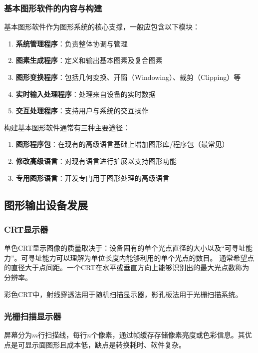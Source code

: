\documentclass[12pt]{article}
\begin{document}
\subsubsection*{基本图形软件的内容与构建}

基本图形软件作为图形系统的核心支撑，一般应包含以下模块：
\begin{enumerate}[label=\arabic*.]
    \item \textbf{系统管理程序}：负责整体协调与管理
    \item \textbf{图素生成程序}：定义和输出基本图素及复合图素
    \item \textbf{图形变换程序}：包括几何变换、开窗（Windowing）、裁剪（Clipping）等
    \item \textbf{实时输入处理程序}：处理来自设备的实时数据
    \item \textbf{交互处理程序}：支持用户与系统的交互操作
\end{enumerate}

构建基本图形软件通常有三种主要途径：
\begin{enumerate}[label=\arabic*.]
    \item \textbf{图形程序包}：在现有的高级语言基础上增加图形库/程序包（最常见）
    \item \textbf{修改高级语言}：对现有语言进行扩展以支持图形功能
    \item \textbf{专用图形语言}：开发专门用于图形处理的高级语言
\end{enumerate}

\subsection{图形输出设备发展}

\subsubsection{CRT显示器}
单色CRT显示图像的质量取决于：设备固有的单个光点直径的大小以及“可寻址能力”。可寻址能力可以理解为单位长度内能够利用的单个光点的数目。
通常希望点的直径大于点间距。一个CRT在水平或垂直方向上能够识别出的最大光点数称为分辨率。

彩色CRT中，射线穿透法用于随机扫描显示器，影孔板法用于光栅扫描系统。

\subsubsection{光栅扫描显示器}
屏幕分为$m$行扫描线，每行$n$个像素，通过帧缓存存储像素亮度或色彩信息。其优点是可显示面图形且成本低，缺点是转换耗时、软件复杂。
\end{document}
